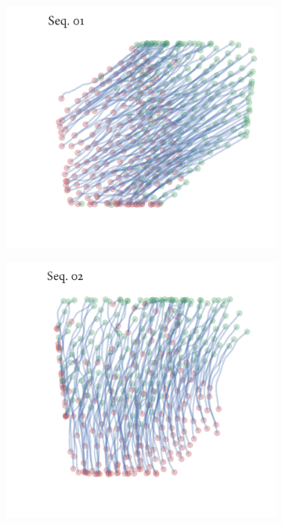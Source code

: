 \begin{figure}[h]
	\begin{subfigure}[t]{0.5\textwidth}
		\centering
		\includegraphics{sequence01.pdf}
	\end{subfigure}%
	\begin{subfigure}[t]{0.5\textwidth}
		\centering
		\includegraphics{sequence02.pdf}
	\end{subfigure}
	\begin{subfigure}[t]{0.5\textwidth}
		\centering

\end{subfigure}
\end{figure}

